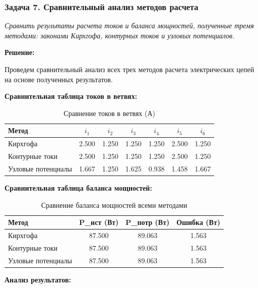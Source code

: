 \subsubsection{Задача 7. Сравнительный анализ методов расчета}
\textit{Сравнить результаты расчета токов и баланса мощностей, полученные тремя методами: законами Кирхгофа, контурных токов и узловых потенциалов.}

\textbf{Решение:}

Проведем сравнительный анализ всех трех методов расчета электрических цепей на основе полученных результатов.

\textbf{Сравнительная таблица токов в ветвях:}
\begin{table}[H]
\centering
\begin{tabular}{|l|c|c|c|c|c|c|}
\hline
\textbf{Метод} & $i_1$ & $i_2$ & $i_3$ & $i_4$ & $i_5$ & $i_6$ \\
\hline
Кирхгофа & 2.500 & 1.250 & 1.250 & 1.250 & 2.500 & 1.250 \\
\hline
Контурные токи & 2.500 & 1.250 & 1.250 & 1.250 & 2.500 & 1.250 \\
\hline
Узловые потенциалы & 1.667 & 1.250 & 1.625 & 0.938 & 1.458 & 1.667 \\
\hline
\end{tabular}
\caption{Сравнение токов в ветвях (А)}
\label{tab:currents_comparison}
\end{table}


\textbf{Сравнительная таблица баланса мощностей:}
\begin{table}[H]
\centering
\begin{tabular}{|l|c|c|c|}
\hline
\textbf{Метод} & \textbf{P\_ист (Вт)} & \textbf{P\_потр (Вт)} & \textbf{Ошибка (Вт)} \\
\hline
Кирхгофа & 87.500 & 89.063 & 1.563 \\
\hline
Контурные токи & 87.500 & 89.063 & 1.563 \\
\hline
Узловые потенциалы & 87.500 & 89.063 & 1.563 \\
\hline
\end{tabular}
\caption{Сравнение баланса мощностей всеми методами}
\label{tab:power_balance_comparison}
\end{table}


\textbf{Анализ результатов:}

